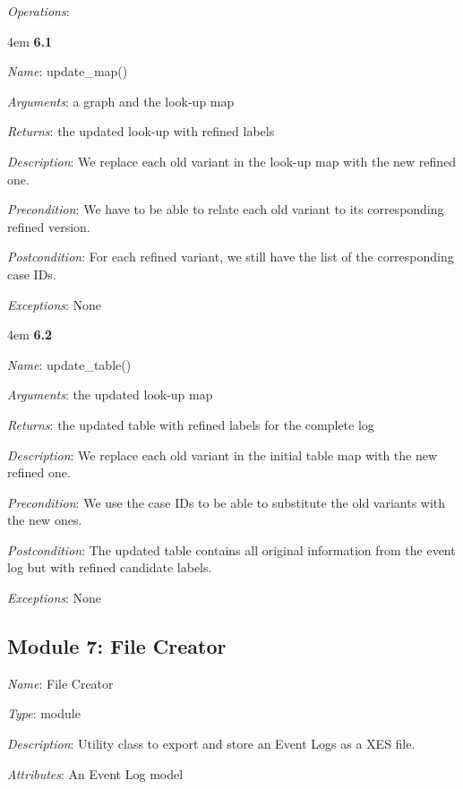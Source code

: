 \documentclass[notitlepage]{article}
\begin{document}
\begin{flushleft}
\textit{Operations}: 
\medskip

\par
\begingroup
\leftskip4em
\textbf{6.1} 

\textit{Name}: update\_map()

\textit{Arguments}: a graph and the look-up map

\textit{Returns}: the updated look-up with refined labels

\textit{Description}: We replace each old variant in the look-up map with the new refined one.

\textit{Precondition}: We have to be able to relate each old variant to its corresponding refined version.

\textit{Postcondition}: For each refined variant, we still have the list of the corresponding case IDs.

\textit{Exceptions}: None
\par
\endgroup


\medskip

\par
\begingroup
\leftskip4em
\textbf{6.2} 

\textit{Name}: update\_table()

\textit{Arguments}: the updated look-up map

\textit{Returns}: the updated table with refined labels for the complete log

\textit{Description}: We replace each old variant in the initial table map with the new refined one.

\textit{Precondition}: We use the case IDs to be able to substitute the old variants with the new ones.

\textit{Postcondition}: The updated table contains all original information from the event log but with refined candidate labels.

\textit{Exceptions}: None
\par
\endgroup




\subsection{Module 7: File Creator}
\textit{Name}: File Creator

\textit{Type}: module

\textit{Description}: Utility class to export and store an Event Logs as a XES file.

\textit{Attributes}: An Event Log model


\end{flushleft}
\end{document}
